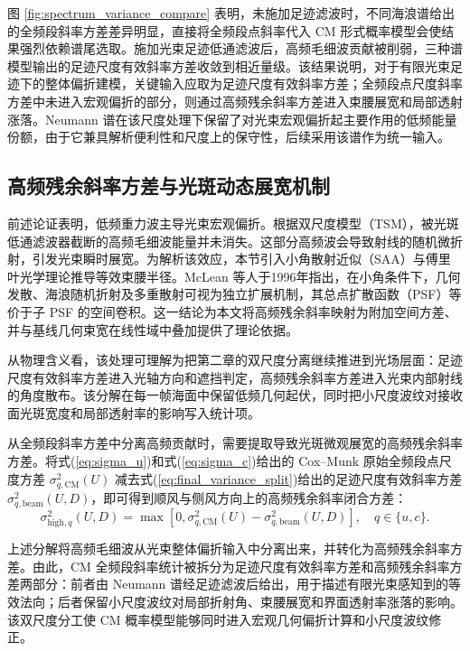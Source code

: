 图 \ref{fig:spectrum_variance_compare} 表明，未施加足迹滤波时，不同海浪谱给出的全频段斜率方差差异明显，直接将全频段点斜率代入 CM 形式概率模型会使结果强烈依赖谱尾选取。施加光束足迹低通滤波后，高频毛细波贡献被削弱，三种谱模型输出的足迹尺度有效斜率方差收敛到相近量级。该结果说明，对于有限光束足迹下的整体偏折建模，关键输入应取为足迹尺度有效斜率方差；全频段点尺度斜率方差中未进入宏观偏折的部分，则通过高频残余斜率方差进入束腰展宽和局部透射涨落。Neumann 谱在该尺度处理下保留了对光束宏观偏折起主要作用的低频能量份额，由于它兼具解析便利性和尺度上的保守性，后续采用该谱作为统一输入。

\subsection{高频残余斜率方差与光斑动态展宽机制}

前述论证表明，低频重力波主导光束宏观偏折。根据双尺度模型（TSM），被光斑低通滤波器截断的高频毛细波能量并未消失。这部分高频波会导致射线的随机微折射，引发光束瞬时展宽。为解析该效应，本节引入小角散射近似（SAA）与傅里叶光学理论推导等效束腰半径。McLean 等人于1996年指出，在小角条件下，几何发散、海浪随机折射及多重散射可视为独立扩展机制，其总点扩散函数（PSF）等价于子 PSF 的空间卷积。这一结论为本文将高频残余斜率映射为附加空间方差、并与基线几何束宽在线性域中叠加提供了理论依据。

从物理含义看，该处理可理解为把第二章的双尺度分离继续推进到光场层面：足迹尺度有效斜率方差进入光轴方向和遮挡判定，高频残余斜率方差进入光束内部射线的角度散布。该分解在每一帧海面中保留低频几何起伏，同时把小尺度波纹对接收面光斑宽度和局部透射率的影响写入统计项。

从全频段斜率方差中分离高频贡献时，需要提取导致光斑微观展宽的高频残余斜率方差。将式(\ref{eq:sigma_u})和式(\ref{eq:sigma_c})给出的 Cox--Munk 原始全频段点尺度方差 $\sigma_{q,\mathrm{CM}}^2(U)$ 减去式(\ref{eq:final_variance_split})给出的足迹尺度有效斜率方差 $\sigma_{q,\mathrm{beam}}^2(U,D)$，即可得到顺风与侧风方向上的高频残余斜率闭合方差：
\begin{equation}
	\sigma_{\mathrm{high},q}^2(U,D)=
	\max\left[0,\sigma_{q,\mathrm{CM}}^2(U)-\sigma_{q,\mathrm{beam}}^2(U,D)\right],
	\quad q\in\{u,c\}.
	\label{eq:c3_residual_slope_var}
\end{equation}

上述分解将高频毛细波从光束整体偏折输入中分离出来，并转化为高频残余斜率方差。由此，CM 全频段斜率统计被拆分为足迹尺度有效斜率方差和高频残余斜率方差两部分：前者由 Neumann 谱经足迹滤波后给出，用于描述有限光束感知到的等效法向；后者保留小尺度波纹对局部折射角、束腰展宽和界面透射率涨落的影响。该双尺度分工使 CM 概率模型能够同时进入宏观几何偏折计算和小尺度波纹修正。

